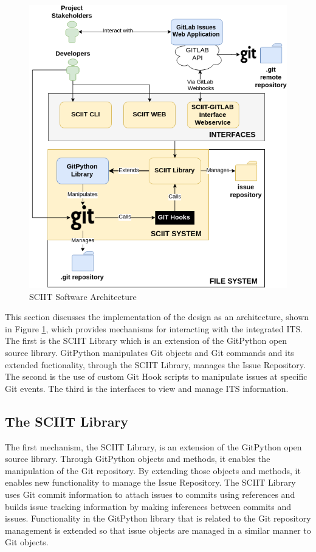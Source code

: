 \documentclass{mproj}
\begin{document}
\begin{figure}[h!]
\caption{SCIIT Software Architecture}
\label{fig:sciit-software-arch}
\centering
\includegraphics[width=12cm]{sciit-software-arch}
\end{figure}

This section discusses the implementation of the design as an architecture, shown in Figure \ref{fig:sciit-software-arch}, which provides mechanisms for interacting with the integrated ITS. The first is the SCIIT Library which is an extension of the GitPython open source library. GitPython manipulates Git objects and Git commands and its extended fuctionality, through the SCIIT Library, manages the Issue Repository. The second is the use of custom Git Hook scripts to manipulate issues at specific Git events.  The third is the interfaces to view and manage ITS information.

\subsection{The SCIIT Library}

The first mechanism, the SCIIT Library, is an extension of the GitPython open source library. Through GitPython objects and methods, it enables the manipulation of the Git repository. By extending those objects and methods, it enables new functionality to manage the Issue Repository. The SCIIT Library uses Git commit information to attach issues to commits using references and builds issue tracking information by making inferences between commits and issues. Functionality in the GitPython library that is related to the Git repository management is extended so that issue objects are managed in a similar manner to Git objects.
\end{document}

